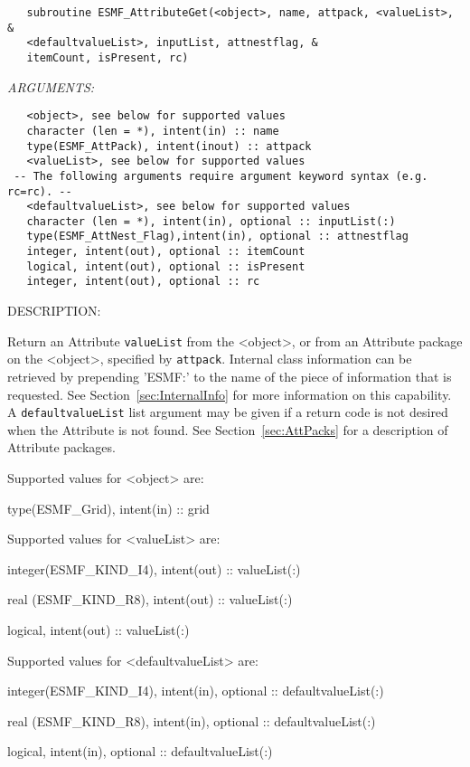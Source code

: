   
\begin{verbatim}   subroutine ESMF_AttributeGet(<object>, name, attpack, <valueList>, &
   <defaultvalueList>, inputList, attnestflag, &
   itemCount, isPresent, rc)\end{verbatim}{\em ARGUMENTS:}
\begin{verbatim}   <object>, see below for supported values
   character (len = *), intent(in) :: name
   type(ESMF_AttPack), intent(inout) :: attpack
   <valueList>, see below for supported values
 -- The following arguments require argument keyword syntax (e.g. rc=rc). --
   <defaultvalueList>, see below for supported values
   character (len = *), intent(in), optional :: inputList(:)
   type(ESMF_AttNest_Flag),intent(in), optional :: attnestflag
   integer, intent(out), optional :: itemCount
   logical, intent(out), optional :: isPresent
   integer, intent(out), optional :: rc\end{verbatim}
{\sf DESCRIPTION:\\ }


   Return an Attribute {\tt valueList} from the <object>, or from an
   Attribute package on the <object>, specified by {\tt attpack}. Internal class
   information can be retrieved by prepending 'ESMF:'
   to the name of the piece of information that is requested. See
   Section~\ref{sec:InternalInfo} for more information
   on this capability.
   A {\tt defaultvalueList} list argument may be given if
   a return code is not desired when the Attribute is not found.
   See Section~\ref{sec:AttPacks} for a description of Attribute packages.
  
   Supported values for <object> are:
   \begin{description}
   \item type(ESMF\_Grid), intent(in) :: grid
   \end{description}
  
   Supported values for <valueList> are:
   \begin{description}
   \item integer(ESMF\_KIND\_I4), intent(out) :: valueList(:)
   \item real (ESMF\_KIND\_R8), intent(out) :: valueList(:)
   \item logical, intent(out) :: valueList(:)
   \end{description}
  
   Supported values for <defaultvalueList> are:
   \begin{description}
   \item integer(ESMF\_KIND\_I4), intent(in), optional :: defaultvalueList(:)
   \item real (ESMF\_KIND\_R8), intent(in), optional :: defaultvalueList(:)
   \item logical, intent(in), optional :: defaultvalueList(:)
   \end{description}
  
